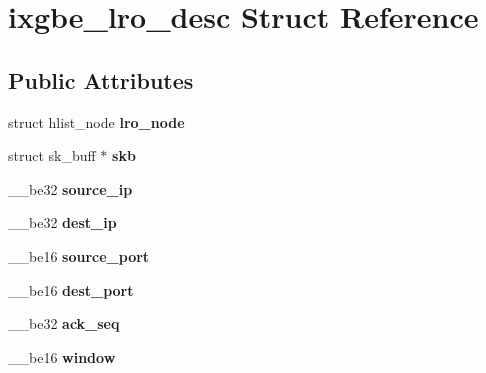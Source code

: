 \hypertarget{structixgbe__lro__desc}{
\section{ixgbe\_\-lro\_\-desc Struct Reference}
\label{structixgbe__lro__desc}
}
\subsection*{Public Attributes}
\begin{DoxyCompactItemize}
\item 
\hypertarget{structixgbe__lro__desc_abca027ad7550101f92154596fee26196}{
struct hlist\_\-node {\bfseries lro\_\-node}}
\label{structixgbe__lro__desc_abca027ad7550101f92154596fee26196}

\item 
\hypertarget{structixgbe__lro__desc_af5e07305bad85ed9b4b6ccbefe5dd04e}{
struct sk\_\-buff $\ast$ {\bfseries skb}}
\label{structixgbe__lro__desc_af5e07305bad85ed9b4b6ccbefe5dd04e}

\item 
\hypertarget{structixgbe__lro__desc_aadca827beea9dd395d4d4445dd4ed24a}{
\_\-\_\-be32 {\bfseries source\_\-ip}}
\label{structixgbe__lro__desc_aadca827beea9dd395d4d4445dd4ed24a}

\item 
\hypertarget{structixgbe__lro__desc_a877f06689077f2a8c69fcacccd3c219d}{
\_\-\_\-be32 {\bfseries dest\_\-ip}}
\label{structixgbe__lro__desc_a877f06689077f2a8c69fcacccd3c219d}

\item 
\hypertarget{structixgbe__lro__desc_a1a548e60234648526e7ed7cec08f281a}{
\_\-\_\-be16 {\bfseries source\_\-port}}
\label{structixgbe__lro__desc_a1a548e60234648526e7ed7cec08f281a}

\item 
\hypertarget{structixgbe__lro__desc_a7025fbb507b74b0e4fac5d199cfcfc20}{
\_\-\_\-be16 {\bfseries dest\_\-port}}
\label{structixgbe__lro__desc_a7025fbb507b74b0e4fac5d199cfcfc20}

\item 
\hypertarget{structixgbe__lro__desc_a44050703f0eec5106c323d82114cb0c3}{
\_\-\_\-be32 {\bfseries ack\_\-seq}}
\label{structixgbe__lro__desc_a44050703f0eec5106c323d82114cb0c3}

\item 
\hypertarget{structixgbe__lro__desc_a8d095166c0cda6b820cdfe96d0dfa60c}{
\_\-\_\-be16 {\bfseries window}}
\label{structixgbe__lro__desc_a8d095166c0cda6b820cdfe96d0dfa60c}


\end{DoxyCompactItemize}
